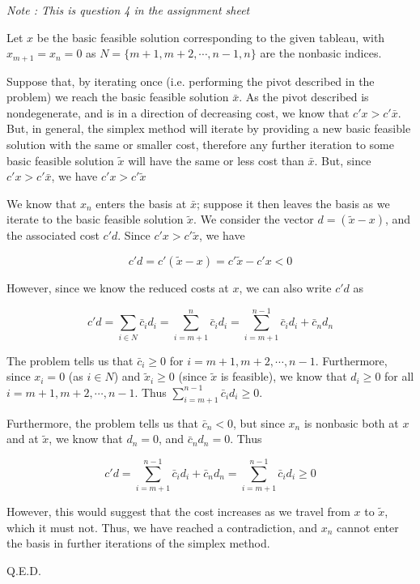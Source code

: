 \textit{Note : This is question 4 in the assignment sheet}

Let $x$ be the basic feasible solution corresponding to the given tableau, with $x_{m+1}=x_n=0$ as $N=\{m+1, m+2, \cdots , n-1, n\}$ are the nonbasic indices. 

Suppose that, by iterating once (i.e. performing the pivot described in the problem) we reach the basic feasible solution $\bar{x}$. As the pivot described is nondegenerate, and is in a direction of decreasing cost, we know that $c'x>c'\bar{x}$. But, in general, the simplex method will iterate by providing a new basic feasible solution with the same or smaller cost, therefore any further iteration to some basic feasible solution $\tilde{x}$ will have the same or less cost than $\bar{x}$. But, since $c'x>c'\bar{x}$, we have $c'x>c'\tilde{x}$

We know that $x_n$ enters the basis at $\bar{x}$; suppose it then leaves the basis as we iterate to the basic feasible solution $\tilde{x}$. We consider the vector $d=(\tilde{x}-x)$, and the associated cost $c'd$. Since $c'x>c'\tilde{x}$, we have

$$
c'd=c'(\tilde{x}-x)=c'\tilde{x}-c'x<0
$$

However, since we know the reduced costs at $x$, we can also write $c'd$ as

$$
c'd=\sum_{i\in N}\bar{c}_id_i=\sum_{i=m+1}^n\bar{c}_id_i=\sum_{i=m+1}^{n-1}\bar{c}_id_i+\bar{c}_nd_n
$$

The problem tells us that $\bar{c}_i\geq 0$ for $i=m+1, m+2, \cdots, n-1$. Furthermore, since $x_i=0$ (as $i\in N$) and $\tilde{x}_i\geq 0$ (since $\tilde{x}$ is feasible), we know that $d_i\geq 0$ for all $i=m+1, m+2, \cdots, n-1$. Thus $\sum_{i=m+1}^{n-1}\bar{c}_id_i\geq 0$.

Furthermore, the problem tells us that $\bar{c}_n<0$, but since $x_n$ is nonbasic both at $x$ and at $\tilde{x}$, we know that $d_n=0$, and $\bar{c}_nd_n=0$. Thus

$$
c'd=\sum_{i=m+1}^{n-1}\bar{c}_id_i+\bar{c}_nd_n=\sum_{i=m+1}^{n-1}\bar{c}_id_i \geq 0
$$

However, this would suggest that the cost increases as we travel from $x$ to $\tilde{x}$, which it must not. Thus, we have reached a contradiction, and $x_n$ cannot enter the basis in further iterations of the simplex method.

Q.E.D.




